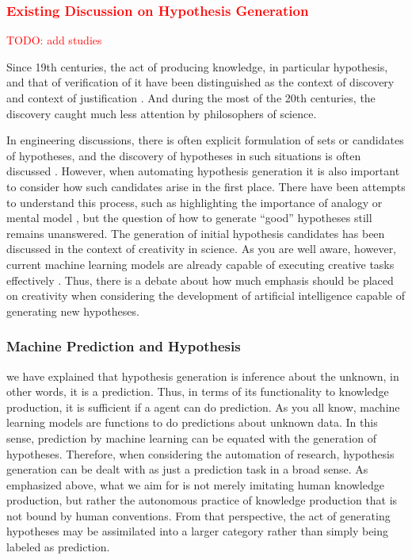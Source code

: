 \documentclass{book}
\begin{document}
\subsubsection{\textcolor{red}{Existing Discussion on Hypothesis Generation}}
\textcolor{red}{TODO: add studies}


Since 19th centuries, the act of producing knowledge, in particular hypothesis, and that of verification of it have been distinguished as the context of discovery and context of justification \cite{sep-scientific-discovery}. And during the most of the 20th centuries, the discovery caught much less attention by philosophers of science. 

In engineering discussions, there is often explicit formulation of sets or candidates of hypotheses, and the discovery of hypotheses in such situations is often discussed \cite{simon1973does,kitano2021nobel,bengio2022ml4sci}. However, when automating hypothesis generation it is also important to consider how such candidates arise in the first place. There have been attempts to understand this process, such as highlighting the importance of analogy \cite{thagard1984conceptual} or mental model \cite{nersessian1999model}, but the question of how to generate ``good'' hypotheses still remains unanswered. The generation of initial hypothesis candidates has been discussed in the context of creativity in science. As you are well aware, however, current machine learning models are already capable of executing creative tasks effectively \cite{sep-creativity}. Thus, there is a debate about how much emphasis should be placed on creativity when considering the development of artificial intelligence capable of generating new hypotheses.


\subsubsection{Machine Prediction and Hypothesis}
we have explained that hypothesis generation is inference about the unknown, in other words, it is a prediction. Thus, in terms of its functionality to knowledge production, it is sufficient if a agent can do prediction. As you all know, machine learning models are functions to do predictions about unknown data. In this sense, prediction by machine learning can be equated with the generation of hypotheses. Therefore, when considering the automation of research, hypothesis generation can be dealt with as just a prediction task in a broad sense. As emphasized above, what we aim for is not merely imitating human knowledge production, but rather the autonomous practice of knowledge production that is not bound by human conventions. From that perspective, the act of generating hypotheses may be assimilated into a larger category rather than simply being labeled as prediction.
\end{document}
